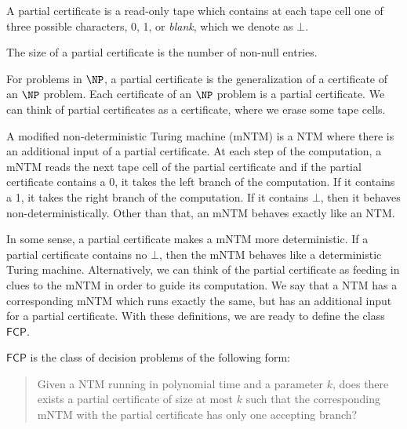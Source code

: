 \documentclass[runningheads,a4paper]{llncs}
\begin{document}
\begin{definition}
A partial certificate is a read-only tape which contains at each tape cell one of three possible characters, 0, 1, or \emph{blank}, which we denote as $\bot$.
\end{definition}

\begin{definition}
The size of a partial certificate is the number of non-null entries. 
\end{definition}

For problems in $\NP$, a partial certificate is the generalization of a certificate of an $\NP$ problem. Each certificate of an $\NP$ problem is a partial certificate. We can think of partial certificates as a certificate, where we erase some tape cells.

\begin{definition}
A modified non-deterministic Turing machine (mNTM) is a NTM where there is an additional input of a partial certificate. At each step of the computation, a mNTM reads the next tape cell of the partial certificate and if the partial certificate contains a 0, it takes the left branch of the computation. If it contains a 1, it takes the right branch of the computation. If it contains $\bot$, then it behaves non-deterministically. Other than that, an mNTM behaves exactly like an NTM.
\end{definition}

In some sense, a partial certificate makes a mNTM more deterministic. If a partial certificate contains no $\bot$, then the mNTM behaves like a deterministic Turing machine. Alternatively, we can think of the partial certificate as feeding in clues to the mNTM in order to guide its computation. We say that a NTM has a corresponding mNTM which runs exactly the same, but has an additional input for a partial certificate. With these definitions, we are ready to define the class $\mathsf{FCP}$.

\begin{definition}
$\mathsf{FCP}$ is the class of decision problems of the following form:\\
\begin{quote}
Given a NTM running in polynomial time and a parameter $k$, does there exists a partial certificate of size at most $k$ such that the corresponding mNTM with the partial certificate has only one accepting branch?
\end{quote}
\end{definition}
\end{document}
